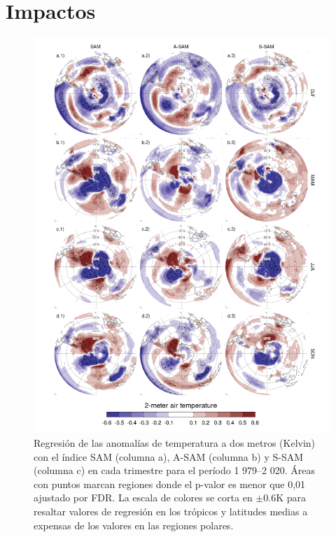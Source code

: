 \documentclass[12pt,oneside,a4paper]{reedthesis}
\begin{document}
\hypertarget{impacts}{%
\section{Impactos}\label{impacts}}



\begin{figure}

{\centering \includegraphics{figures/30-sam/regr-air-season-1} 

}

\caption{Regresión de las anomalías de temperatura a dos metros (Kelvin) con el índice SAM (columna a), A-SAM (columna b) y S-SAM (columna c) en cada trimestre para el período 1 979--2 020. Áreas con puntos marcan regiones donde el p-valor es menor que 0,01 ajustado por FDR. La escala de colores se corta en \(\pm0.6 \mathrm{K}\) para resaltar valores de regresión en los trópicos y latitudes medias a expensas de los valores en las regiones polares.}\label{fig:regr-air-season}
\end{figure}
\end{document}
